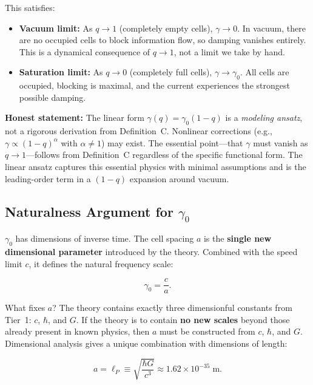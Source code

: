 \documentclass[aps,prd,twocolumn,showpacs,superscriptaddress,preprintnumbers]{revtex4-2}
\begin{document}
This satisfies:

\begin{itemize}
    \item \textbf{Vacuum limit:} As $q\to 1$ (completely empty cells), $\gamma\to 0$. In vacuum, there are no occupied cells to block information flow, so damping vanishes entirely. This is a dynamical consequence of $q\to 1$, not a limit we take by hand.
    \item \textbf{Saturation limit:} As $q\to 0$ (completely full cells), $\gamma\to\gamma_0$. All cells are occupied, blocking is maximal, and the current experiences the strongest possible damping.
\end{itemize}

\textbf{Honest statement:} The linear form $\gamma(q)=\gamma_0(1-q)$ is a \emph{modeling ansatz}, not a rigorous derivation from Definition~C.
Nonlinear corrections (e.g., $\gamma\propto(1-q)^\alpha$ with $\alpha\neq 1$) may exist.
The essential point---that $\gamma$ must vanish as $q\to 1$---follows from Definition~C regardless of the specific functional form.
The linear ansatz captures this essential physics with minimal assumptions and is the leading-order term in a $(1-q)$ expansion around vacuum.

\subsection{Naturalness Argument for $\gamma_0$}
\label{sec:naturalness}

$\gamma_0$ has dimensions of inverse time.
The cell spacing $a$ is the \textbf{single new dimensional parameter} introduced by the theory.
Combined with the speed limit $c$, it defines the natural frequency scale:

\begin{equation}
\gamma_0 = \frac{c}{a}.
\label{eq:gamma0_form}
\end{equation}

What fixes $a$?
The theory contains exactly three dimensionful constants from Tier~1: $c$, $\hbar$, and $G$.
If the theory is to contain \textbf{no new scales} beyond those already present in known physics, then $a$ must be constructed from $c$, $\hbar$, and $G$.
Dimensional analysis gives a unique combination with dimensions of length:

\begin{equation}
a = \ell_P \equiv \sqrt{\frac{\hbar G}{c^3}} \approx 1.62 \times 10^{-35}\;\text{m}.
\label{eq:lp_def}
\end{equation}
\end{document}

